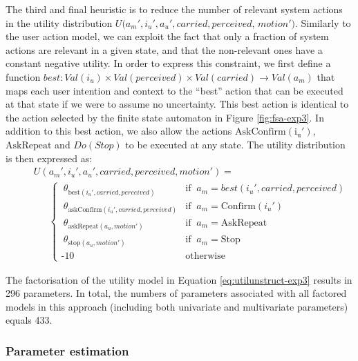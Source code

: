 The third and final heuristic is to reduce the number of relevant system actions in the utility distribution $U(a_m', i_u', a_u', \mathit{carried}, \mathit{perceived}$, $\mathit{motion'})$.  Similarly to the user action model, we can exploit the fact that only a fraction of system actions are relevant in a given state, and that the non-relevant ones have a constant negative utility. In order to express this constraint, we first define a function $best: \mathit{Val}(i_u) \times \mathit{Val}(\mathit{perceived}) \times \mathit{Val}(\mathit{carried}) \rightarrow \mathit{Val}(a_m)$ that maps each user intention and context to the ``best'' action that can be executed at that state if we were to assume no uncertainty. This best action is identical to the action selected by the finite state automaton in Figure \ref{fig:fsa-exp3}. In addition to this best action, we also allow the actions $\mathrm{AskConfirm(i_u')}$, $\mathrm{AskRepeat}$ and $Do(Stop)$ to be executed at any state. The utility distribution is then expressed as: 
\begin{align}
&&& U(a_m', i_u', a_u', \mathit{carried}, \mathit{perceived}, \mathit{motion'}) = \nonumber \\
&&& \ \ \ \ \ \ \  \begin{cases} \ \theta_{\text{best}(i_u', \mathit{carried}, \mathit{perceived})} & \text{if } \ a_m = best(i_u', \mathit{carried}, \mathit{perceived}) \\ 
\ \theta_{\text{askConfirm}(i_u', \mathit{carried}, \mathit{perceived})} & \text{if } \ a_m = \mathrm{Confirm}(i_u') \\
\ \theta_{\text{askRepeat}(a_u, \mathit{motion'})} & \text{if } \ a_m = \mathrm{AskRepeat} \\
\ \theta_{\text{stop}(a_u,\mathit{motion'})} & \text{if } \ a_m = \mathrm{Stop} \\ 
\mbox{-}10 & \text{otherwise}
\end{cases} \label{eq:utilunstruct-exp3}
\end{align}

The factorisation of the utility model in Equation \eqref{eq:utilunstruct-exp3} results in 296 parameters. In total, the numbers of parameters associated with all factored models in this approach (including both univariate and multivariate parameters) equals 433.

\subsubsection*{Parameter estimation}

